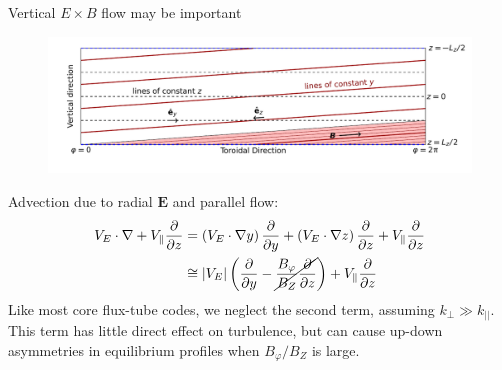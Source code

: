 \documentclass[12pt,table]{beamer}
\begin{document}
\begin{frame}{Vertical $E \times B$ flow may be important}
\vspace{.5cm}
\begin{figure}
    \centering
    \includegraphics[trim= 0cm .5cm 0cm 1cm,width=\linewidth]{figs/helimak-B-field.pdf}
    \label{fig:cyl-map}
\end{figure}
\vspace{-.5cm}
\footnotesize
Advection due to radial $\bm{E}$ and parallel flow:
\begin{align}
    V_E \cdot \nabla + V_\parallel \frac{\partial}{\partial z} &= 
    \left( V_E \cdot \nabla y \right) \frac{\partial}{ \partial y} + \left( V_E \cdot \nabla z \right) \frac{\partial}{ \partial z} + V_\parallel \frac{\partial}{\partial z} \\
    &\cong |V_E| \left( \frac{\partial}{ \partial y} - \cancel{\frac{B_\varphi}{B_Z} \frac{\partial}{\partial z}}\right) + V_\parallel \frac{\partial}{\partial z} 
\end{align}
Like most core flux-tube codes, we neglect the second term, assuming $k_{\perp} \gg k_{||}$. This term has little direct effect on turbulence, but can cause up-down asymmetries in equilibrium profiles when $B_\varphi/B_Z$ is large.
\end{frame}
\end{document}
